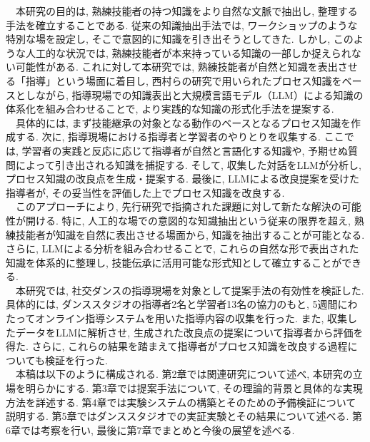 　本研究の目的は, 熟練技能者の持つ知識をより自然な文脈で抽出し, 整理する手法を確立することである. 従来の知識抽出手法では, ワークショップのような特別な場を設定し, そこで意図的に知識を引き出そうとしてきた. しかし, このような人工的な状況では, 熟練技能者が本来持っている知識の一部しか捉えられない可能性がある. これに対して本研究では, 熟練技能者が自然と知識を表出させる「指導」という場面に着目し, 西村らの研究\cite{Nishimura2017}で用いられたプロセス知識をベースとしながら, 指導現場での知識表出と大規模言語モデル（LLM）による知識の体系化を組み合わせることで, より実践的な知識の形式化手法を提案する. \\
　具体的には, まず技能継承の対象となる動作のベースとなるプロセス知識を作成する. 次に, 指導現場における指導者と学習者のやりとりを収集する. ここでは, 学習者の実践と反応に応じて指導者が自然と言語化する知識や, 予期せぬ質問によって引き出される知識を捕捉する. そして, 収集した対話をLLMが分析し, プロセス知識の改良点を生成・提案する. 最後に, LLMによる改良提案を受けた指導者が, その妥当性を評価した上でプロセス知識を改良する. \\
　このアプローチにより, 先行研究で指摘された課題に対して新たな解決の可能性が開ける. 特に, 人工的な場での意図的な知識抽出という従来の限界を超え, 熟練技能者が知識を自然に表出させる場面から, 知識を抽出することが可能となる. さらに, LLMによる分析を組み合わせることで, これらの自然な形で表出された知識を体系的に整理し, 技能伝承に活用可能な形式知として確立することができる. \\
　本研究では, 社交ダンスの指導現場を対象として提案手法の有効性を検証した. 具体的には, ダンススタジオの指導者2名と学習者13名の協力のもと, 5週間にわたってオンライン指導システムを用いた指導内容の収集を行った. また, 収集したデータをLLMに解析させ, 生成された改良点の提案について指導者から評価を得た. さらに, これらの結果を踏まえて指導者がプロセス知識を改良する過程についても検証を行った.\\
　本稿は以下のように構成される. 第2章では関連研究について述べ, 本研究の立場を明らかにする. 第3章では提案手法について, その理論的背景と具体的な実現方法を詳述する. 第4章では実験システムの構築とそのための予備検証について説明する. 第5章ではダンススタジオでの実証実験とその結果について述べる. 第6章では考察を行い, 最後に第7章でまとめと今後の展望を述べる.\\


